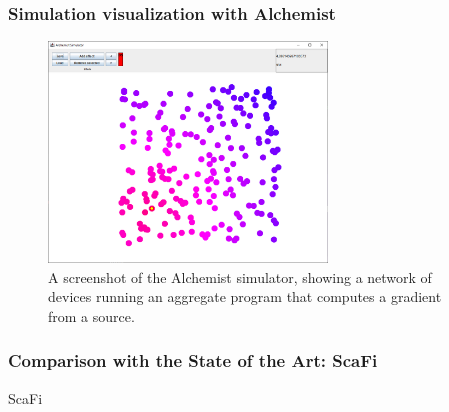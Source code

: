 \begin{frame}
    \frametitle{Simulation visualization with Alchemist}
    \begin{figure}
        \label{fig:alchemist-demo}
        \centering
        \includegraphics[width=0.66\textwidth]{figures/alchemist-demo.png}
        \caption{A screenshot of the Alchemist simulator, showing a network of devices running an aggregate program that computes a gradient from a source.}
    \end{figure}
\end{frame}

%         

%         

\begin{frame}
    \frametitle{Comparison with the State of the Art: ScaFi}
    \begin{exampleblock}{ScaFi}
        
    \end{exampleblock}
\end{frame}

